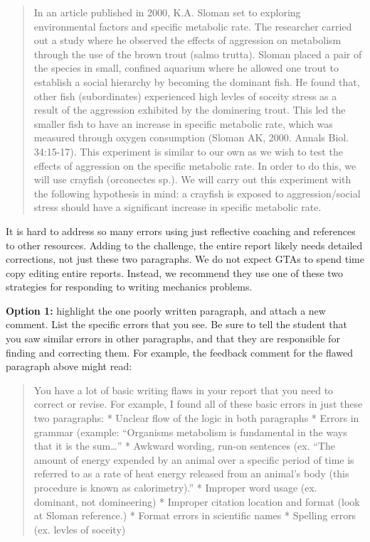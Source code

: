 \documentclass[
]{book}
\begin{document}
\begin{quote}
In an article published in 2000, K.A. Sloman set to exploring environmental factors and specific metabolic rate. The researcher carried out a study where he observed the effects of aggression on metabolism through the use of the brown trout (salmo trutta). Sloman placed a pair of the species in small, confined aquarium where he allowed one trout to establish a social hierarchy by becoming the dominant fish. He found that, other fish (subordinates) experienced high levles of soceity stress as a result of the aggression exhibited by the dominering trout. This led the smaller fish to have an increase in specific metabolic rate, which was measured through oxygen consumption (Sloman AK, 2000. Annals Biol. 34:15-17). This experiment is similar to our own as we wish to test the effects of aggression on the specific metabolic rate. In order to do this, we will use crayfish (orconectes sp.). We will carry out this experiment with the following hypothesis in mind: a crayfish is exposed to aggression/social stress should have a significant increase in specific metabolic rate.
\end{quote}

It is hard to address so many errors using just reflective coaching and references to other resources. Adding to the challenge, the entire report likely needs detailed corrections, not just these two paragraphs. We do not expect GTAs to spend time copy editing entire reports. Instead, we recommend they use one of these two strategies for responding to writing mechanics problems.

\textbf{Option 1:} highlight the one poorly written paragraph, and attach a new comment. List the specific errors that you see. Be sure to tell the student that you saw similar errors in other paragraphs, and that they are responsible for finding and correcting them. For example, the feedback comment for the flawed paragraph above might read:

\begin{quote}
You have a lot of basic writing flaws in your report that you need to correct or revise. For example, I found all of these basic errors in just these two paragraphs:
* Unclear flow of the logic in both paragraphs
* Errors in grammar (example: ``Organisms metabolism is fundamental in the ways that it is the sum\ldots{}''
* Awkward wording, run-on sentences (ex. ``The amount of energy expended by an animal over a specific period of time is referred to as a rate of heat energy released from an animal's body (this procedure is known as calorimetry).''
* Improper word usage (ex. dominant, not domineering)
* Improper citation location and format (look at Sloman reference.)
* Format errors in scientific names
* Spelling errors (ex. levles of soceity)
\end{quote}
\end{document}
